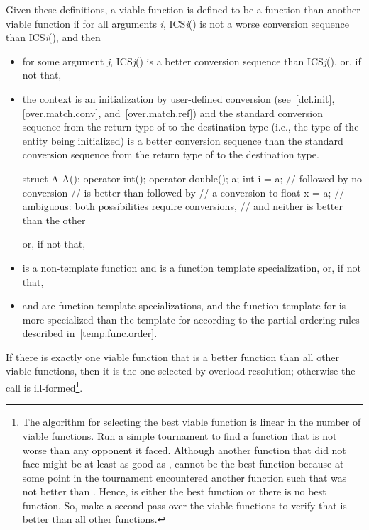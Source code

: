 Given these definitions, a viable function
is defined
to be a
function than another viable function
if
for all arguments
\textit{i},
ICS\textit{i}() is not a worse conversion
sequence than ICS\textit{i}(), and then
\begin{itemize}

\item
for some argument
\textit{j},
ICS\textit{j}() is a better conversion
sequence than ICS\textit{j}(), or, if not that,

\item
the context is an initialization by user-defined conversion
(see~\ref{dcl.init},
\ref{over.match.conv}, and~\ref{over.match.ref})
and the standard conversion sequence from the return type of
to the destination type (i.e., the type of the entity being initialized)
is a better conversion sequence than the standard conversion sequence
from the return type of
to the destination type.
\enterexample

\begin{codeblock}
struct A {
  A();
  operator int();
  operator double();
} a;
int i = a;                      //  followed by no conversion
                                // is better than  followed by
                                // a conversion to 
float x = a;                    // ambiguous: both possibilities require conversions,
                                // and neither is better than the other
\end{codeblock}
\exitexample
or, if not that,

\item
{}
is a non-template function and
is a
function template
specialization, or, if not that,

\item
{}
and
are
function template specializations,
and the function template
for
is more specialized than the template for
according to the partial ordering rules described in~\ref{temp.func.order}.
\end{itemize}

\pnum
If there is exactly one viable function that is a better function
than all other viable functions, then it is the one selected by
overload resolution; otherwise the call is ill-formed\footnote{The algorithm
for selecting the best viable function is linear in the number
of viable
functions.
Run a simple tournament to find a function
that is not
worse than any
opponent it faced.
Although another function
that
did not face
might be at least as good as
,
cannot be the best function because at some point in the
tournament
encountered another function
such that
was not better than
.
Hence,
is either
the best function or there is no best function.
So, make a second pass over
the viable
functions to verify that
is better than all other functions.}.

